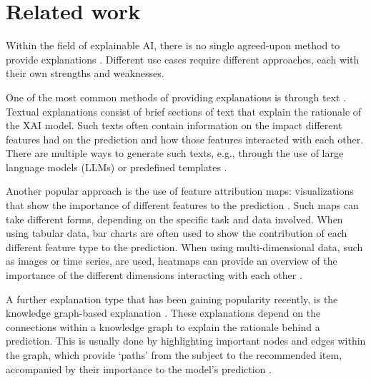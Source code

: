 \section{Related work}
Within the field of explainable AI, there is no single agreed-upon method to provide explanations \cite{arya2019one}. Different use cases require different approaches, each with their own strengths and weaknesses. 

One of the most common methods of providing explanations is through text \cite{goebel2018explainable,poli2021generation,szymanski2021visual}. Textual explanations consist of brief sections of text that explain the rationale of the XAI model. Such texts often contain information on the impact different features had on the prediction and how those features interacted with each other. There are multiple ways to generate such texts, e.g., through the use of large language models (LLMs) \cite{menon2022visual} or predefined templates \cite{wrede2022linguistic}. 

Another popular approach is the use of feature attribution maps: visualizations that show the importance of different features to the prediction \cite{palacio2021xai}. Such maps can take different forms, depending on the specific task and data involved. When using tabular data, bar charts are often used to show the contribution of each different feature type to the prediction. When using multi-dimensional data, such as images or time series, are used, heatmaps can provide an overview of the importance of the different dimensions interacting with each other \cite{fauvel2021xcm}. 

A further explanation type that has been gaining popularity recently, is the knowledge graph-based explanation \cite{tiddi2022knowledge}. These explanations depend on the connections within a knowledge graph to explain the rationale behind a prediction. This is usually done by highlighting important nodes and edges within the graph, which provide `paths' from the subject to the recommended item, accompanied by their importance to the model's prediction \cite{wang2019kgat}. 


